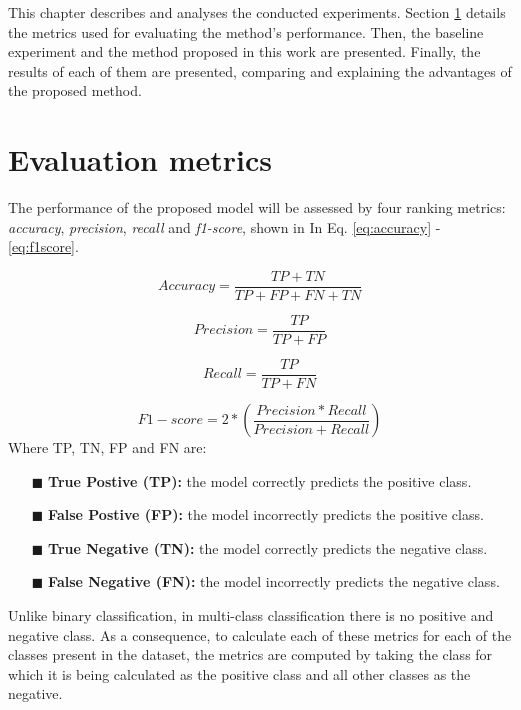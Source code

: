 \label{chapter:4}
This chapter describes and analyses the conducted experiments. Section \ref{sec:evMetrics} details the metrics used for evaluating the method's performance. Then, the baseline experiment and the method proposed in this work are presented. Finally, the results of each of them are presented, comparing and explaining the advantages of the proposed method.

\section{Evaluation metrics}
\label{sec:evMetrics}
The performance of the proposed model will be assessed by four ranking metrics: \emph{accuracy}, \emph{precision}, \emph{recall} and \emph{f1-score}, shown in In Eq. \ref{eq:accuracy} - \ref{eq:f1score}.

\begin{equation}
\label{eq:accuracy}
    Accuracy = \frac{TP + TN}{TP + FP + FN + TN}
\end{equation}

\begin{equation}
\label{eq:precision}
    Precision = \frac{TP}{TP + FP}
\end{equation}

\begin{equation}
\label{eq:recall}
    Recall = \frac{TP}{TP + FN}
\end{equation}

\begin{equation}
\label{eq:f1score}
    F1-score = 2* \left(\frac{Precision*Recall}{Precision + Recall}\right)
\end{equation}Where TP, TN, FP and FN are:
\begin{itemize}[]
    \item[\tiny$\blacksquare$]\textbf{True Postive (TP):} the model correctly predicts the positive class.
    \item[\tiny$\blacksquare$]\textbf{False Postive (FP):} the model incorrectly predicts the positive class.
    \item[\tiny$\blacksquare$]\textbf{True Negative (TN):} the model correctly predicts the negative class.
    \item[\tiny$\blacksquare$]\textbf{False Negative (FN):} the model incorrectly predicts the negative class.
\end{itemize}

Unlike binary classification, in multi-class classification there is no positive and negative class. As a consequence, to calculate each of these metrics for each of the classes present in the dataset, the metrics are computed by taking the class for which it is being calculated as the positive class and all other classes as the negative.

